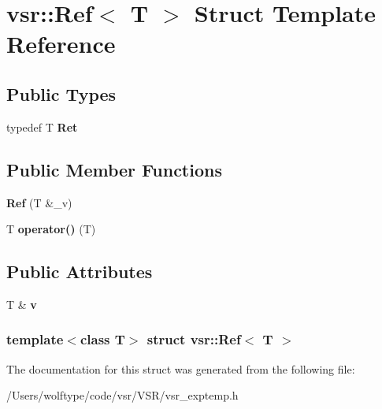 \hypertarget{structvsr_1_1_ref}{\section{vsr\-:\-:Ref$<$ T $>$ Struct Template Reference}
\label{structvsr_1_1_ref}
}
\subsection*{Public Types}
\begin{DoxyCompactItemize}
\item 
\hypertarget{structvsr_1_1_ref_a175fe90795b7439d16ea5f287c91530c}{typedef T {\bfseries Ret}}\label{structvsr_1_1_ref_a175fe90795b7439d16ea5f287c91530c}

\end{DoxyCompactItemize}
\subsection*{Public Member Functions}
\begin{DoxyCompactItemize}
\item 
\hypertarget{structvsr_1_1_ref_a31b75b39a8caf836e43b05e04d7f4d09}{{\bfseries Ref} (T \&\-\_\-v)}\label{structvsr_1_1_ref_a31b75b39a8caf836e43b05e04d7f4d09}

\item 
\hypertarget{structvsr_1_1_ref_a8ba56f5d650662cf2e50b0e628b8cf92}{T {\bfseries operator()} (T)}\label{structvsr_1_1_ref_a8ba56f5d650662cf2e50b0e628b8cf92}

\end{DoxyCompactItemize}
\subsection*{Public Attributes}
\begin{DoxyCompactItemize}
\item 
\hypertarget{structvsr_1_1_ref_a5106704d14358a25fe79e6000e250b87}{T \& {\bfseries v}}\label{structvsr_1_1_ref_a5106704d14358a25fe79e6000e250b87}

\end{DoxyCompactItemize}
\subsubsection*{template$<$class T$>$ struct vsr\-::\-Ref$<$ T $>$}



The documentation for this struct was generated from the following file\-:\begin{DoxyCompactItemize}
\item 
/\-Users/wolftype/code/vsr/\-V\-S\-R/vsr\-\_\-exptemp.\-h\end{DoxyCompactItemize}
